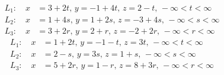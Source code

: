 \begin{align*}
L_1:\quad x&=3+2t,\,y=-1+4t,\,z=2-t,\,-\infty<t<\infty\\
L_2:\quad x&=1+4s,\,y=1+2s,\,z=-3+4s,\,-\infty<s<\infty\\
L_3:\quad x&=3+2r,\, y=2+r,\,z=-2+2r,\,-\infty<r<\infty
\end{align*}
\begin{align*}
L_1:\quad x&=1+2t,\,y=-1-t,\,z=3t,\,-\infty<t<\infty\\
L_2:\quad x&=2-s,\,y=3s,\,z=1+s,\,-\infty<s<\infty\\
L_3:\quad x&=5+2r,\,y=1-r,\,z=8+3r,\,-\infty<r<\infty
\end{align*}

